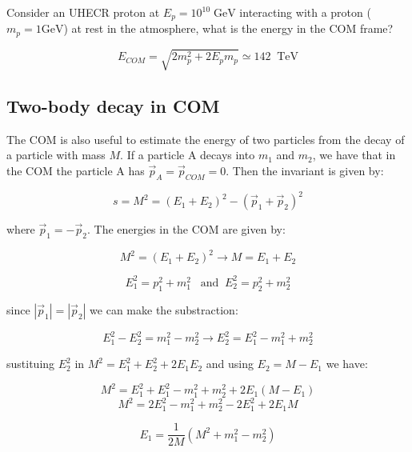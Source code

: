 \documentclass[
  letterpaper,
  DIV=11,
  numbers=noendperiod]{scrreprt}
\begin{document}
\begin{tcolorbox}[enhanced jigsaw, colframe=quarto-callout-tip-color-frame, opacitybacktitle=0.6, left=2mm, leftrule=.75mm, opacityback=0, colbacktitle=quarto-callout-tip-color!10!white, breakable, bottomrule=.15mm, toprule=.15mm, colback=white, coltitle=black, bottomtitle=1mm, toptitle=1mm, titlerule=0mm, title=\textcolor{quarto-callout-tip-color}{\faLightbulb}\hspace{0.5em}{Example 2: UHECR protons}, arc=.35mm, rightrule=.15mm]

Consider an UHECR proton at \(E_p = 10^{10}\;\mathrm{ GeV}\) interacting
with a proton (\(m_p = 1 \mathrm{ GeV}\)) at rest in the atmosphere,
what is the energy in the COM frame?

\[E_{COM} = \sqrt{2 m_p^2 + 2 E_p m_p} \simeq 142\;\; \mathrm{ TeV} \]

\end{tcolorbox}

\subsection*{Two-body decay in COM}\label{two-body-decay-in-com}

The COM is also useful to estimate the energy of two particles from the
decay of a particle with mass \(M\). If a particle A decays into \(m_1\)
and \(m_2\), we have that in the COM the particle A has
\({\vec p_A} = {\vec p_{COM}} = 0\). Then the invariant is given by:

\[ s = M^2 = (E_1 + E_2)^2 -  (\vec{p}_1 + \vec{p}_2)^2 \]

where \({\vec p_1} = -{\vec p_2}\). The energies in the COM are given
by:

\[ M^2 = (E_1 + E_2)^2 \rightarrow M = E_1 + E_2 \]

\[E_1^2 = p_1^2 + m_1^2\;\;\;\mathrm{ and}\;\; E_2^2 = p_2^2 + m_2^2\]

since \(|{\vec p_1}| = |{\vec p_2}|\) we can make the substraction:

\[E_1^2 - E_2^2 = m_1^2 - m_2^2 \rightarrow E_2^2 = E_1^2 - m_1^2 + m_2^2\]

sustituing \(E_2^2\) in \(M^2 = E_1^2 + E_2^2 + 2E_1 E_2\) and using
\(E_2 = M - E_1\) we have:

\[M^2 = E_1^2 + E_1^2 - m_1^2 + m_2^2 + 2E_1(M- E_1) \]
\[M^2 = 2E_1^2 - m_1^2 + m_2^2 - 2E_1^2 + 2E_1M\]

\[E_1 = \frac{1}{2M}(M^2 + m_1^2 - m_2^2)\]
\end{document}

